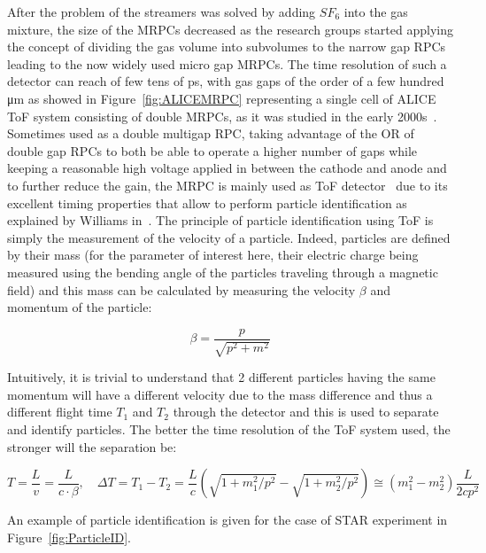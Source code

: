 	After the problem of the streamers was solved by adding $SF_6$ into the gas mixture, the size of the MRPCs decreased as the research groups started applying the concept of dividing the gas volume into subvolumes to the narrow gap RPCs leading to the now widely used micro gap MRPCs. The time resolution of such a detector can reach of few tens of \si{ps}, with gas gaps of the order of a few hundred \si{\micro m} as showed in Figure~\ref{fig:ALICEMRPC} representing a single cell of ALICE \acf{ToF} system consisting of double MRPCs, as it was studied in the early 2000s~\cite{ALICE2002}. Sometimes used as a double multigap RPC, taking advantage of the OR of double gap RPCs to both be able to operate a higher number of gaps while keeping a reasonable high voltage applied in between the cathode and anode and to further reduce the gain, the MRPC is mainly used as ToF detector~\cite{ALICE2002,START2002,BESIII2014,CBM2007,MPD2016} due to its excellent timing properties that allow to perform particle identification as explained by Williams in~\cite{WILLIAMS2012}. The principle of particle identification using ToF is simply the measurement of the velocity of a particle. Indeed, particles are defined by their mass (for the parameter of interest here, their electric charge being measured using the bending angle of the particles traveling through a magnetic field) and this mass can be calculated by measuring the velocity $\beta$ and momentum of the particle:
	
	\begin{equation}
		\beta = \frac{p}{\sqrt{p^2 + m^2}}
	\end{equation}
	
	Intuitively, it is trivial to understand that 2 different particles having the same momentum will have a different velocity due to the mass difference and thus a different flight time $T_1$ and $T_2$ through the detector and this is used to separate and identify particles. The better the time resolution of the ToF system used, the stronger will the separation be:
	
	\begin{equation}
		T = \frac{L}{v} = \frac{L}{c\cdot\beta}, \quad \Delta T = T_1 - T_2 = \frac{L}{c}\left(\sqrt{1+m_1^2/p^2} - \sqrt{1+m_2^2/p^2}\right) \cong (m_1^2 - m_2^2)\frac{L}{2cp^2}
	\end{equation}
	
	An example of particle identification is given for the case of STAR experiment in Figure~\ref{fig:ParticleID}.
	
